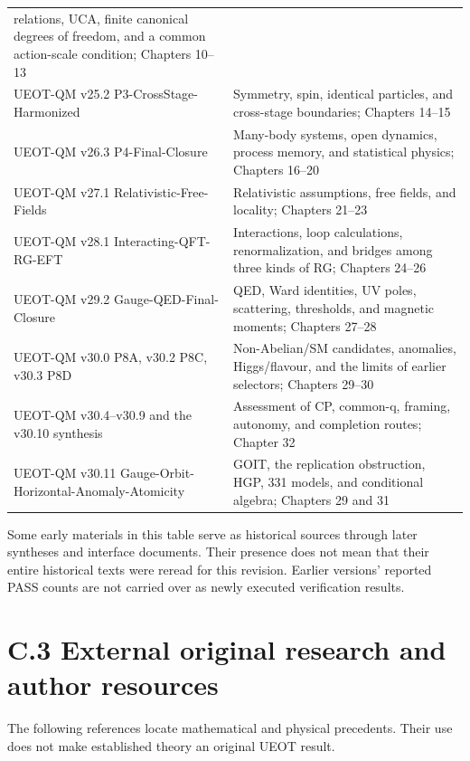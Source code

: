 \documentclass[
  11pt,
  oneside]{book}
\begin{document}
\begin{longtable}[]{@{}
  >{\raggedright\arraybackslash}p{}
  >{\raggedright\arraybackslash}p{}@{}}
relations, UCA, finite canonical degrees of freedom, and a common
action-scale condition; Chapters 10--13 \\
UEOT-QM v25.2 P3-CrossStage-Harmonized & Symmetry, spin, identical
particles, and cross-stage boundaries; Chapters 14--15 \\
UEOT-QM v26.3 P4-Final-Closure & Many-body systems, open dynamics,
process memory, and statistical physics; Chapters 16--20 \\
UEOT-QM v27.1 Relativistic-Free-Fields & Relativistic assumptions, free
fields, and locality; Chapters 21--23 \\
UEOT-QM v28.1 Interacting-QFT-RG-EFT & Interactions, loop calculations,
renormalization, and bridges among three kinds of RG; Chapters 24--26 \\
UEOT-QM v29.2 Gauge-QED-Final-Closure & QED, Ward identities, UV poles,
scattering, thresholds, and magnetic moments; Chapters 27--28 \\
UEOT-QM v30.0 P8A, v30.2 P8C, v30.3 P8D & Non-Abelian/SM candidates,
anomalies, Higgs/flavour, and the limits of earlier selectors; Chapters
29--30 \\
UEOT-QM v30.4--v30.9 and the v30.10 synthesis & Assessment of CP,
common-q, framing, autonomy, and completion routes; Chapter 32 \\
UEOT-QM v30.11 Gauge-Orbit-Horizontal-Anomaly-Atomicity & GOIT, the
replication obstruction, HGP, 331 models, and conditional algebra;
Chapters 29 and 31 \\
\end{longtable}

Some early materials in this table serve as historical sources through
later syntheses and interface documents. Their presence does not mean
that their entire historical texts were reread for this revision.
Earlier versions' reported PASS counts are not carried over as newly
executed verification results.

\section{C.3 External original research and author resources}

The following references locate mathematical and physical precedents.
Their use does not make established theory an original UEOT result.
\end{document}
